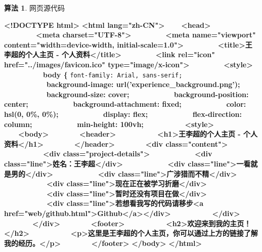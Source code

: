 \documentclass[supercite]{Experimental_Report}
\theoremstyle{definition}
\newtheorem{alg}{算法}[section]
\begin{document}
\begin{shaded*}
	\begin{alg}{网页源代码}
		\label{alg:1}
		\begin{algorithmic}
			\State \textbf{<!DOCTYPE html>}
			\State \textbf{<html lang="zh-CN">}
			\State \ \ \ \ \textbf{<head>}
			\State \ \ \ \ \ \ \ \ \ \textbf{<meta charset="UTF-8">}
			\State \ \ \ \ \ \ \ \ \ \textbf{<meta name="viewport" content="width=device-width, initial-scale=1.0">}
			\State \ \ \ \ \ \ \ \ \ \textbf{<title>王李超的个人主页 - 个人资料</title>}
			\State \ \ \ \ \ \ \ \ \ \textbf{<link rel="icon" href="../images/favicon.ico" type="image/x-icon">}
			\State \ \ \ \ \ \ \ \ \ \textbf{<style>}
			\State \ \ \ \ \ \ \ \ \ \ \ \textbf{body \{} \texttt{font-family: Arial, sans-serif;}
			\State \ \ \ \ \ \ \ \ \ \ \ \ \textbf{background-image: url('experience\_background.png');}
			\State \ \ \ \ \ \ \ \ \ \ \ \ \textbf{background-size: cover;}
			\State \ \ \ \ \ \ \ \ \ \ \ \ \textbf{background-position: center;}
			\State \ \ \ \ \ \ \ \ \ \ \ \ \textbf{background-attachment: fixed;}
			\State \ \ \ \ \ \ \ \ \ \ \ \ \textbf{color: hsl(0, 0\%, 0\%); }
			\State \ \ \ \ \ \ \ \ \ \ \ \ \textbf{display: flex;}
			\State \ \ \ \ \ \ \ \ \ \ \ \ \textbf{flex-direction: column;}
			\State \ \ \ \ \ \ \ \ \ \ \ \ \textbf{min-height: 100vh;}
			\State \ \ \ \ \ \ \ \ \ \ \ \textbf{<style>}
			\State \ \ \ \ \textbf{<body>}
			\State \ \ \ \ \ \ \ \ \textbf{<header>}
			\State \ \ \ \ \ \ \ \ \ \ \ \textbf{<h1>王李超的个人主页 - 个人资料</h1>}
			\State \ \ \ \ \ \ \ \ \textbf{</header>}
			\State \ \ \ \ \ \ \ \ \textbf{<div class="content">}
			\State \ \ \ \ \ \ \ \ \ \ \ \textbf{<div class="project-details">}
			\State \ \ \ \ \ \ \ \ \ \ \ \ \textbf{<div class="line">姓名：王李超</div>}
			\State \ \ \ \ \ \ \ \ \ \ \ \ \textbf{<div class="line">一看就是男的</div>}
			\State \ \ \ \ \ \ \ \ \ \ \ \ \textbf{<div class="line">广涉猎而不精</div>}
			\State \ \ \ \ \ \ \ \ \ \ \ \ \textbf{<div class="line">现在正在被学习折磨</div>}
			\State \ \ \ \ \ \ \ \ \ \ \ \ \textbf{<div class="line">暂时还没有项目在做</div>}
			\State \ \ \ \ \ \ \ \ \ \ \ \ \textbf{<div class="line">若想看我写的代码请移步<a href="web/github.html">Github</a></div>}
			\State \ \ \ \ \ \ \ \ \ \ \ \textbf{</div>}
			\State \ \ \ \ \ \ \ \ \textbf{</div>}
			\State \ \ \ \ \ \ \ \ \textbf{<footer>}
			\State \ \ \ \ \ \ \ \ \ \ \ \textbf{<h2>欢迎来到我的主页！</h2>}
			\State \ \ \ \ \ \ \ \ \ \ \ \textbf{<p>这里是王李超的个人主页，你可以通过上方的链接了解我的经历。</p>}
			\State \ \ \ \ \ \ \ \ \textbf{</footer>}
			\State \textbf{</body>}
			\State \textbf{</html>}
		\end{algorithmic}
	\end{alg}
	\end{shaded*}
	
\end{document}
